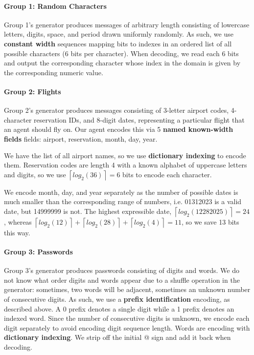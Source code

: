 \documentclass{article}
\begin{document}
\paragraph{Group 1: Random Characters}
Group 1's generator produces messages of arbitrary length consisting of lowercase letters, digits, space, and period drawn uniformly randomly. As such, we use \textbf{constant width} sequences mapping bits to indexes in an ordered list of all possible characters (6 bits per character). When decoding, we read each 6 bits and output the corresponding character whose index in the domain is given by the corresponding numeric value.

\paragraph{Group 2: Flights}
Group 2's generator produces messages consisting of 3-letter airport codes, 4-character reservation IDs, and 8-digit dates, representing a particular flight that an agent should fly on. Our agent encodes this via 5 \textbf{named known-width fields} fields: airport, reservation, month, day, year.

We have the list of all airport names, so we use \textbf{dictionary indexing} to encode them. Reservation codes are length 4 with a known alphabet of uppercase letters and digits, so we use $\left\lceil log_2(36)\right\rceil = 6$ bits to encode each character.

We encode month, day, and year separately as the number of possible dates is much smaller than the corresponding range of numbers, i.e. 01312023 is a valid date, but 14999999 is not. The highest expressible date, $\left\lceil{log_2(12282025)}\right\rceil = 24$, whereas $\left\lceil{log_2(12)}\right\rceil + \left\lceil{log_2(28)}\right\rceil + \left\lceil{log_2(4)}\right\rceil = 11$, so we save 13 bits this way.

\paragraph{Group 3: Passwords} Group 3's generator produces passwords consisting of digits and words. We do not know what order digits and words appear due to a shuffle operation in the generator: sometimes, two words will be adjacent, sometimes an unknown number of consecutive digits. As such, we use a \textbf{prefix identification} encoding, as described above. A 0 prefix denotes a single digit while a 1 prefix denotes an indexed word. Since the number of consecutive digits is unknown, we encode each digit separately to avoid encoding digit sequence length. Words are encoding with \textbf{dictionary indexing}. We strip off the initial @ sign and add it back when decoding.
\end{document}
